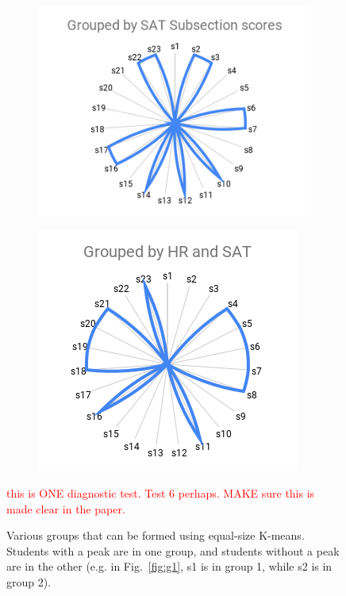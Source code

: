 \begin{figure}[ht!]
    \begin{subfigure}{\columnwidth}
    \centering
    \includegraphics[width=1.13\columnwidth]{figs/images/GroupedbySATSubsection.png}
    \caption{}
    \label{fig:g3}
    \end{subfigure}%
    \begin{subfigure}{\columnwidth}
    \centering
    \includegraphics[width=.95\columnwidth]{figs/images/GroupedbyHRandSATSubsection.png}
    \caption{}
    \label{fig:g4}
    \end{subfigure}
    
    \caption{Various groups that can be formed using equal-size K-means. Students with a peak are in one group, and students without a peak are in the other (e.g. in Fig.~\ref{fig:g1}, s1 is in group 1, while s2 is in group 2).} \textcolor{red}{this is ONE diagnostic test. Test 6 perhaps. MAKE sure this is made clear in the paper. }
    \label{fig:groups}
\end{figure}

